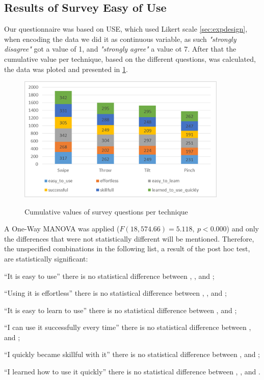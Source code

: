 \subsection{Results of Survey Easy of Use}
Our questionnaire was based on USE, which used Likert scale \ref*{sec:expdesign}, when encoding the data we did it as continuous variable, as such \emph{"strongly disagree"} got a value of 1, and \emph{"strongly agree"} a value ot 7. After that the cumulative value per technique, based on the different questions, was calculated, the data was ploted and presented in \ref{fig:surveyResult}. 
\begin{figure}[H]
	{\includegraphics[width = 1\columnwidth , height = 6cm ]{images/survey-data.png}} 
	\caption{
		Cumulative values of survey questions per technique
	}
	\label{fig:surveyResult}
\end{figure}

A One-Way MANOVA was applied ($F(18, 574.66)=5.118,\ p<0.000$) and only the differences that were not statistically different will be mentioned. 
Therefore, the unspecified combinations in the following list, a result of the post hoc test, are statistically significant: 
\begin{enumerate*}[label=\itshape\arabic*\upshape)]
	\item{``It is easy to use'' there is no statistical difference between \throw, \tilt, and \pinch;}
	\item{``Using it is effortless'' there is no statistical difference between \throw, \tilt, and \pinch;}
	\item{``It is easy to learn to use'' there is no statistical difference between \tilt, and \throw;}
	\item{``I can use it successfully every time'' there is no statistical difference between \tilt, and \pinch;}
	\item{``I quickly became skillful with it'' there is no statistical difference between \pinch, and \tilt;}
	\item{``I learned how to use it quickly'' there is no statistical difference between \throw, \tilt, and \pinch.}
\end{enumerate*}